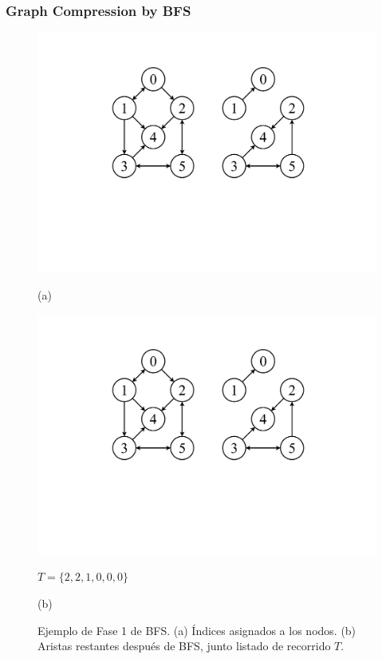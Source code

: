 \begin{frame}
\frametitle{Graph Compression by BFS}

\begin{figure}%
    	\centering
    	\begin{minipage}{0.45\textwidth}
    		\centering
    		\includegraphics[scale=.3, clip, trim=180 230 440 80 ]{../img/arte/graphs-BFS-F1.pdf}
    		
    		(a)
    	\end{minipage}
    	\begin{minipage}{0.45\textwidth}
    		\centering
    		\includegraphics[scale=.3, clip, trim=450 230 170 80]{../img/arte/graphs-BFS-F1.pdf}
    		
    		$T = \{2, 2, 1, 0, 0, 0\}$
    		
    		(b)
    	\end{minipage}

    \caption{Ejemplo de Fase 1 de BFS. (a) Índices asignados a los nodos. (b) Aristas restantes después de BFS, junto listado de recorrido $T$.}
\end{figure}

\end{frame}

